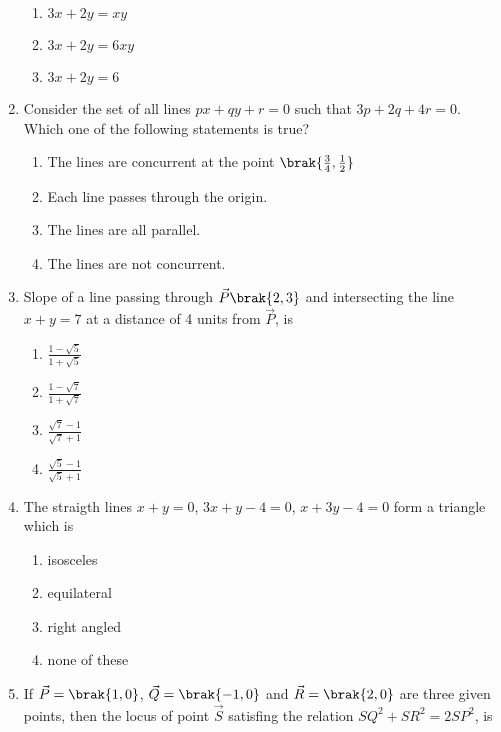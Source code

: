 \begin{enumerate}
\begin{multicols}{2}
\begin{enumerate}
\item $3x+2y = xy$ 
\item $3x+2y = 6xy$ 
\item $3x+2y = 6$
\end{enumerate}
\end{multicols}
%
\item Consider the set of all lines $px+qy+r=0$ such that 
$3p+2q+4r=0$. Which one of the following statements is true? 
%
\hfill {}
\begin{enumerate}
\item The lines are concurrent at the point $\brak{\frac{3}{4}, \frac{1}{2}}$
\item Each line passes through the origin. 
\item The lines are all parallel.
\item The lines are not concurrent.
\end{enumerate}
%
\item Slope of a line passing through $\vec{P}\brak{2, 3}$ and intersecting the line $x+y=7$ at a distance of 4 units from $\vec{P}$, is
%
\hfill {}
\begin{multicols}{4}
\begin{enumerate}
\item $\frac{1-\sqrt{5}}{1+\sqrt{5}}$
\item $\frac{1-\sqrt{7}}{1+\sqrt{7}}$
\item $\frac{\sqrt{7}-1}{\sqrt{7}+1}$
\item $\frac{\sqrt{5}-1}{\sqrt{5}+1}$
\end{enumerate}
\end{multicols}
\item The straigth lines $x+y=0$, $3x+y-4=0$, $x+3y-4=0$ form a triangle which is \hfill {}
\begin{multicols}{2}
\begin{enumerate}   
     \item isosceles
     \item equilateral
     \item right angled
     \item none of these
\end{enumerate}
\end{multicols}
\item If $\vec{P}=\brak{1,0}$, $\vec{Q}=\brak{-1,0}$ and $\vec{R}=\brak{2,0}$ are three given points, then the locus of point $\vec{S}$ satisfing the relation $SQ^2+SR^2=2SP^2$, is 
\hfill {}
\begin{multicols}{2}

\end{multicols}
\end{enumerate}
